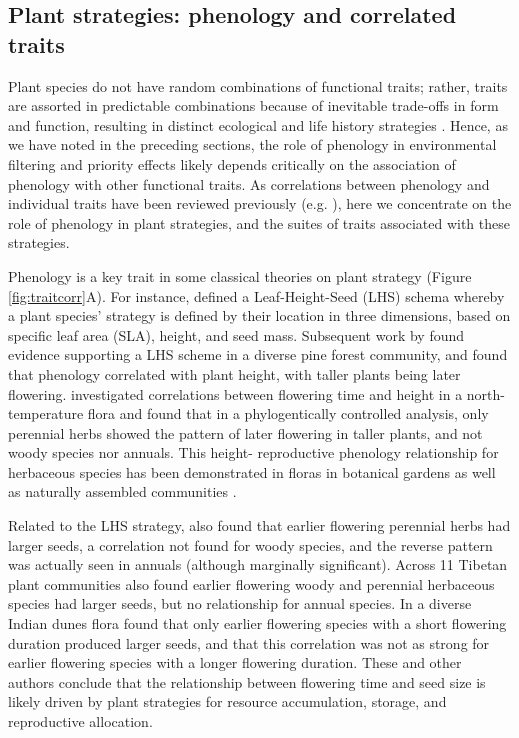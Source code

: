 \documentclass[11pt]{article}
\begin{document}

\subsection*{Plant strategies: phenology and correlated traits}

Plant species do not have random combinations of functional traits; rather, traits are assorted in predictable combinations because of inevitable trade-offs in form and function, resulting in distinct ecological and life history strategies \citep{stearns1998evolution,adler2014functional,westoby2002plant}. Hence, as we have noted in the preceding sections, the role of phenology in environmental filtering and priority effects likely depends critically on the association of phenology with other functional traits. As correlations between phenology and individual traits have been reviewed previously (e.g. \citet{wolkovich2014aob,segrestin2020reproductive}), here we concentrate on the role of phenology in plant strategies, and the suites of traits associated with these strategies.

Phenology is a key trait in some classical theories on plant strategy (Figure \ref{fig:traitcorr}A). For instance, \citet{westoby1998leaf} defined a Leaf-Height-Seed (LHS) schema whereby a plant species’ strategy is defined by their location in three dimensions, based on specific leaf area (SLA), height, and seed mass. Subsequent work by \citet{laughlin2010multi} found evidence supporting a LHS scheme in a diverse pine forest community, and found that phenology correlated with plant height, with taller plants being later flowering. \citet{bolmgren2008time} investigated correlations between flowering time and height in a north-temperature flora and found that in a phylogentically controlled analysis, only perennial herbs showed the pattern of later flowering in taller plants, and not woody species nor annuals. This height- reproductive phenology relationship for herbaceous species has been demonstrated in floras in botanical gardens \citet{sporbert2022functional, horbach2023flowering} as well as naturally assembled communities \citep{du2010trade, liu2021linkage}.

Related to the LHS strategy, \citet{bolmgren2008time} also found that earlier flowering perennial herbs had larger seeds, a correlation not found for woody species, and the reverse pattern was actually seen in annuals (although marginally significant). Across 11 Tibetan plant communities \citet{du2010trade} also found earlier flowering woody and perennial herbaceous species had larger seeds, but no relationship for annual species. In a diverse Indian dunes flora \citet{mazer1990seed} found that only earlier flowering species with a short flowering duration produced larger seeds, and that this correlation was not as strong for earlier flowering species with a longer flowering duration. These and other authors conclude that the relationship between flowering time and seed size is likely driven by plant strategies for resource accumulation, storage, and reproductive allocation.
\end{document}

